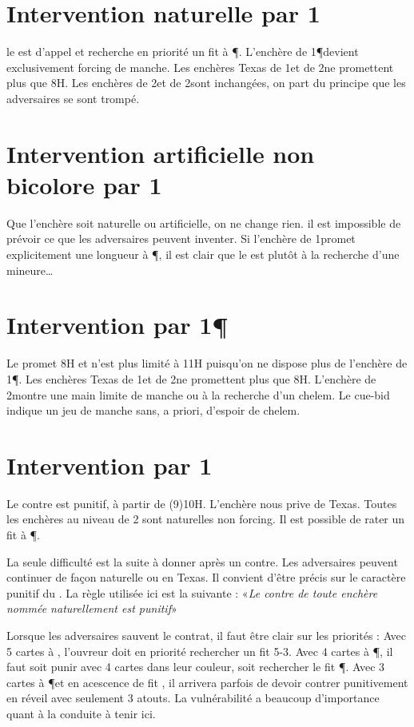 \begin{multicols}{2}
\section*{Intervention naturelle par 1\C}
le \Double est d'appel et recherche en priorité un fit à \P. L'enchère de 1\P devient exclusivement forcing de manche. Les enchères Texas de 1\NT et de 2\T ne promettent plus que 8H.
Les enchères de 2\K et de 2\C sont inchangées, on part du principe que les adversaires se sont trompé.

\section*{Intervention artificielle non bicolore par 1\C}
Que l'enchère soit naturelle ou artificielle, on ne change rien. il est impossible de prévoir ce que les adversaires peuvent inventer.
Si l'enchère de 1\C promet explicitement une longueur à \P, il est clair que le \Double est plutôt à la recherche d'une mineure\dots

\section*{Intervention par 1\P}
Le \Double promet 8H et n'est plus limité à 11H puisqu'on ne dispose plus de l'enchère de 1\P. Les enchères Texas de 1\NT et de 2\T ne promettent plus que 8H.
L'enchère de 2\K montre une main limite de manche ou à la recherche d'un chelem. Le cue-bid indique un jeu de manche sans, a priori, d'espoir de chelem.

\section*{Intervention par 1\NT}

Le contre est punitif, à partir de (9)10H. L'enchère nous prive de Texas. Toutes les enchères au niveau de 2 sont naturelles non forcing. Il est possible de rater un fit à \P.

La seule difficulté est la suite à donner après un contre. Les adversaires peuvent continuer de façon naturelle ou en Texas. Il convient d'être précis sur le caractère punitif du \Double.
La règle utilisée ici est la suivante : «\textit{Le contre de toute enchère nommée naturellement est punitif}»

Lorsque les adversaires sauvent le contrat, il faut être clair sur les priorités : Avec 5 cartes à \C, l'ouvreur doit en priorité rechercher un fit 5-3. Avec 4 cartes à \P, il faut soit punir avec 4 cartes dans leur couleur, soit rechercher le fit \P. Avec 3 cartes à \P et en acescence de fit \C, il arrivera parfois de devoir contrer punitivement en réveil avec seulement 3 atouts. La vulnérabilité a beaucoup d'importance quant à la conduite à tenir ici.



\end{multicols}
